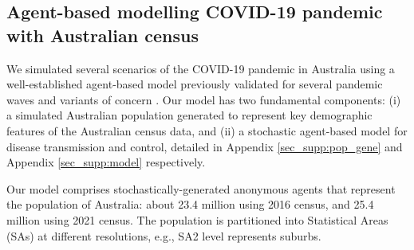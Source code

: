 \documentclass{article}
\begin{document}
\subsection{Agent-based modelling COVID-19 pandemic with Australian census}  

We simulated several scenarios of the COVID-19 pandemic in Australia using a well-established agent-based model previously validated for several pandemic waves and variants of concern \cite{chang_modelling_2020,zachreson_how_2021,chang_simulating_2022,chang_persistence_2023}. Our model has two fundamental components: (i) a simulated Australian population generated to represent key demographic features of the Australian census data, and (ii) a stochastic agent-based model for disease transmission and control,  detailed in Appendix \ref{sec_supp:pop_gene} and Appendix \ref{sec_supp:model} respectively.

Our model comprises stochastically-generated anonymous agents that represent the population of Australia: about 23.4 million using 2016 census, and 25.4 million using 2021 census. The population is partitioned into Statistical Areas (SAs) at different resolutions, e.g., SA2 level represents suburbs.  
\end{document}
